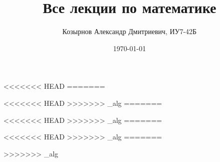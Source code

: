 
\usepackage{newclude}

\title{Все лекции по математике}
\author{Козырнов Александр Дмитриевич, ИУ7-42Б}
\date{\today}


\tableofcontents










<<<<<<< HEAD
=======

<<<<<<< HEAD
>>>>>>> _alg
=======

<<<<<<< HEAD
>>>>>>> _alg
=======

<<<<<<< HEAD
>>>>>>> _alg
=======

>>>>>>> _alg

